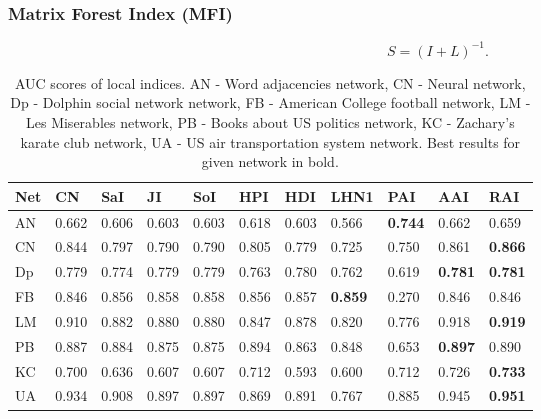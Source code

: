 \documentclass{llncs}
\begin{document}
\subsubsection{Matrix Forest Index (MFI)}
%
\begin{equation}
S = (I + L)^{-1}.
\end{equation}
%
\setlength{\tabcolsep}{5pt}
\renewcommand{\arraystretch}{1.5}
\begin{table}
\begin{center}
\caption{AUC scores of local indices. AN - Word adjacencies network\cite{adjnoun-net}, CN - Neural network\cite{celneur-net}, Dp - Dolphin social network network\cite{dolph-net}, FB - American College football network\cite{foot-net}, LM - Les Miserables network\cite{lesmis-net}, PB - Books about US politics network\cite{polbook-net}, KC - Zachary's karate club network\cite{karate-net}, UA - US air transportation system network\cite{usair-net}. Best results for given network in bold.}
\begin{tabular}{| l | l | l | l | l | l | l | l | l | l | l |}
\hline
Net & CN & SaI & JI & SoI & HPI & HDI & LHN1 & PAI & AAI & RAI \\ \hline
AN & 0.662 & 0.606 & 0.603 & 0.603 & 0.618 & 0.603 & 0.566 & \textbf{0.744} & 0.662 & 0.659 \\ \hline
CN & 0.844 & 0.797 & 0.790 & 0.790 & 0.805 & 0.779 & 0.725 & 0.750 & 0.861 & \textbf{0.866} \\ \hline
Dp & 0.779 & 0.774 & 0.779 & 0.779 & 0.763 & 0.780 & 0.762 & 0.619 & \textbf{0.781} & \textbf{0.781} \\ \hline
FB & 0.846 & 0.856 & 0.858 & 0.858 & 0.856 & 0.857 & \textbf{0.859} & 0.270 & 0.846 & 0.846 \\ \hline
LM & 0.910 & 0.882 & 0.880 & 0.880 & 0.847 & 0.878 & 0.820 & 0.776 & 0.918 & \textbf{0.919} \\ \hline
PB & 0.887 & 0.884 & 0.875 & 0.875 & 0.894 & 0.863 & 0.848 & 0.653 & \textbf{0.897} & 0.890 \\ \hline
KC & 0.700 & 0.636 & 0.607 & 0.607 & 0.712 & 0.593 & 0.600 & 0.712 & 0.726 & \textbf{0.733} \\ \hline
UA & 0.934 & 0.908 & 0.897 & 0.897 & 0.869 & 0.891 & 0.767 & 0.885 & 0.945 & \textbf{0.951} \\ 
\hline
\end{tabular}
\end{center}
\end{table}
%
\setlength{\tabcolsep}{5pt}
\renewcommand{\arraystretch}{1.5}
\end{document}
